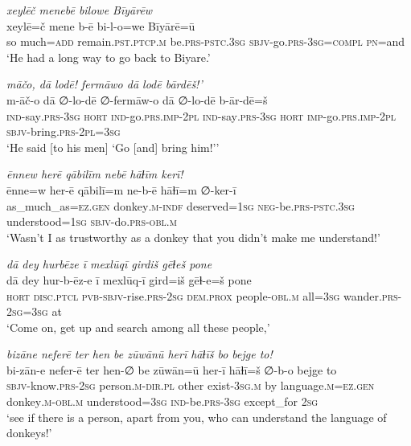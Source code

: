 \ea \label{HB.66}
\textit{xeylēč menebē bilowe Bīyārēw} \\ 
\gll xeylē=č mene b-ē bi-l-o=we Bīyārē=ū \\ 
 so much\textsc{=add} remain\textsc{.pst}\textsc{.ptcp}\textsc{.m} be\textsc{.prs}\textsc{-pstc}\textsc{.3sg} \textsc{sbjv-}go\textsc{.prs}\textsc{-3sg}\textsc{=\textsc{compl}} \textsc{pn}=and \\ 
\glt `He had a long way to go back to Biyare.'
\z 
 
\ea \label{HB.79}
\textit{māčo, dā lodē! fermāwo dā lodē bārdēš!’} \\ 
\gll m-āč-o dā ∅-lo-dē ∅-fermāw-o dā ∅-lo-dē b-ār-dē=š \\ 
 \textsc{ind-}say\textsc{.prs}\textsc{-3sg} \textsc{hort} \textsc{ind-}go\textsc{.prs}\textsc{.imp}\textsc{-2pl} \textsc{ind-}say\textsc{.prs}\textsc{-3sg} \textsc{hort} \textsc{imp-}go\textsc{.prs}\textsc{.imp}\textsc{-2pl} \textsc{sbjv-}bring\textsc{.prs}\textsc{-2pl}\textsc{=3sg} \\ 
\glt `He said [to his men] ‘Go [and] bring him!’'
\z 
 
\ea \label{HB.83}
\textit{ēnnew herē qābilīm nebē hāɫīm kerī!} \\ 
\gll ēnne=w her-ē qābilī=m ne-b-ē hāɫī=m ∅-ker-ī \\ 
 as\_much\_as\textsc{=ez}\textsc{.gen} donkey\textsc{.m}\textsc{-indf} deserved\textsc{=1sg} \textsc{neg-}be\textsc{.prs}\textsc{-pstc}\textsc{.3sg} understood\textsc{=1sg} \textsc{sbjv-}do\textsc{.prs}\textsc{-obl}\textsc{.m} \\ 
\glt `Wasn’t I as trustworthy as a donkey that you didn’t make me understand!'
\z 
 
\ea \label{HB.90}
\textit{dā dey hurbēze ī mexlūqī girdiš gēɫeš pone} \\ 
\gll dā dey hur-b-ēz-e ī mexlūq-ī gird=iš gēɫ-e=š pone \\ 
 \textsc{hort} \textsc{disc.ptcl} \textsc{pvb-}\textsc{sbjv-}rise\textsc{.prs}-\textsc{2sg} \textsc{dem.prox} people\textsc{-obl}\textsc{.m} all\textsc{=3sg} wander\textsc{.prs}-\textsc{2sg}\textsc{=3sg} at \\ 
\glt `Come on, get up and search among all these people,'
\z 
 
\ea \label{HB.91}
\textit{bizāne neferē ter hen be zūwānū herī hāɫīš bo bejge to!} \\ 
\gll bi-zān-e nefer-ē ter hen-∅ be zūwān=ū her-ī hāɫī=š ∅-b-o bejge to \\ 
 \textsc{sbjv-}know\textsc{.prs}-\textsc{2sg} person\textsc{.m}\textsc{-dir}\textsc{.pl} other exist\textsc{-3sg}\textsc{.m} by language\textsc{.m}\textsc{=ez}\textsc{.gen} donkey\textsc{.m}\textsc{-obl}\textsc{.m} understood\textsc{=3sg} \textsc{ind-}be\textsc{.prs}\textsc{-3sg} except\_for \textsc{2sg} \\ 
\glt `see if there is a person, apart from you, who can understand the language of donkeys!'
\z 
 
